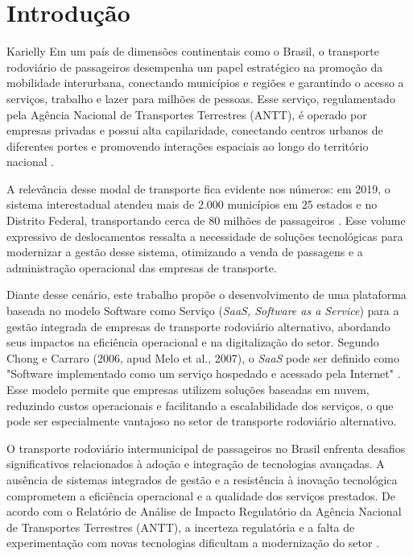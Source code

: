 \chapter{Introdução}  


Karielly Em um país de dimensões continentais como o Brasil, o transporte rodoviário de passageiros desempenha um papel estratégico na promoção da mobilidade interurbana, conectando municípios e regiões e garantindo o acesso a serviços, trabalho e lazer para milhões de pessoas. Esse serviço, regulamentado pela Agência Nacional de Transportes Terrestres (ANTT), é operado por empresas privadas e possui alta capilaridade, conectando centros urbanos de diferentes portes e promovendo interações espaciais ao longo do território nacional \cite{santos2024}.

A relevância desse modal de transporte fica evidente nos números: em 2019, o sistema interestadual atendeu mais de 2.000 municípios em 25 estados e no Distrito Federal, transportando cerca de 80 milhões de passageiros \cite{santos2024}. Esse volume expressivo de deslocamentos ressalta a necessidade de soluções tecnológicas para modernizar a gestão desse sistema, otimizando a venda de passagens e a administração operacional das empresas de transporte.


Diante desse cenário, este trabalho propõe o desenvolvimento de uma plataforma baseada no modelo Software como Serviço (\textit{SaaS, Software as a Service}) para a gestão integrada de empresas de transporte rodoviário alternativo, abordando seus impactos na eficiência operacional e na digitalização do setor. Segundo Chong e Carraro (2006, apud Melo et al., 2007), o \textit{SaaS} pode ser definido como "Software implementado como um serviço hospedado e acessado pela Internet" \cite{melo2007software}. Esse modelo permite que empresas utilizem soluções baseadas em nuvem, reduzindo custos operacionais e facilitando a escalabilidade dos serviços, o que pode ser especialmente vantajoso no setor de transporte rodoviário alternativo.


O transporte rodoviário intermunicipal de passageiros no Brasil enfrenta desafios significativos relacionados à adoção e integração de tecnologias avançadas. A ausência de sistemas integrados de gestão e a resistência à inovação tecnológica comprometem a eficiência operacional e a qualidade dos serviços prestados. De acordo com o Relatório de Análise de Impacto Regulatório da Agência Nacional de Transportes Terrestres (ANTT), a incerteza regulatória e a falta de experimentação com novas tecnologias dificultam a modernização do setor \cite{antt2022}. 

